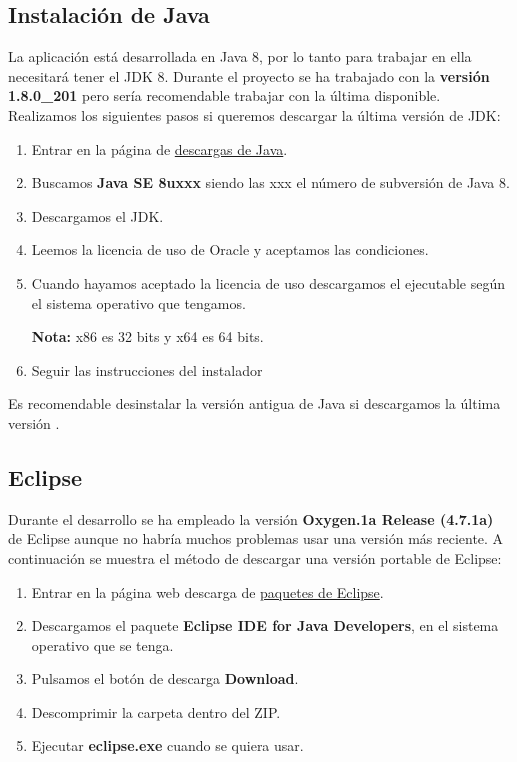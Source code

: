 \subsection{Instalación de Java}

La aplicación está desarrollada en Java 8, por lo tanto para trabajar en ella necesitará tener el JDK 8. Durante el proyecto se ha trabajado con la \textbf{versión 1.8.0\_201} pero sería recomendable trabajar con la última disponible. Realizamos los siguientes pasos si queremos descargar la última versión de JDK: 

\begin{enumerate}
	\item Entrar en la página de  \href{https://www.oracle.com/technetwork/java/javase/downloads/index.html}{descargas de Java}.
	\item Buscamos \textbf{Java SE 8uxxx} siendo las xxx el número de subversión de Java 8. 
	\item Descargamos el JDK.
	\item Leemos la licencia de uso de Oracle y aceptamos las condiciones.
	\item Cuando hayamos aceptado la licencia de uso descargamos el ejecutable según el sistema operativo que tengamos.
	
	\textbf{Nota:} x86 es 32 bits y x64 es 64 bits.
	\item Seguir las instrucciones del instalador
	
	
\end{enumerate}

Es recomendable desinstalar la versión antigua de Java si descargamos la última versión \cite{noauthor_por_nodate}.
\subsection{Eclipse}

Durante el desarrollo se ha empleado la versión \textbf{Oxygen.1a Release (4.7.1a)} de Eclipse aunque no habría muchos problemas usar una versión más reciente. A continuación se muestra el método de descargar una versión portable de Eclipse:

\begin{enumerate}
	\item  Entrar en la página web descarga de \href{https://www.eclipse.org/downloads/packages/}{paquetes de Eclipse}.
	\item Descargamos el paquete \textbf{Eclipse IDE for Java Developers}, en el sistema operativo que se tenga.
	\item Pulsamos el botón de descarga \textbf{Download}.
	\item Descomprimir la carpeta dentro del ZIP.
	\item Ejecutar \textbf{eclipse.exe} cuando se quiera usar.
\end{enumerate}


